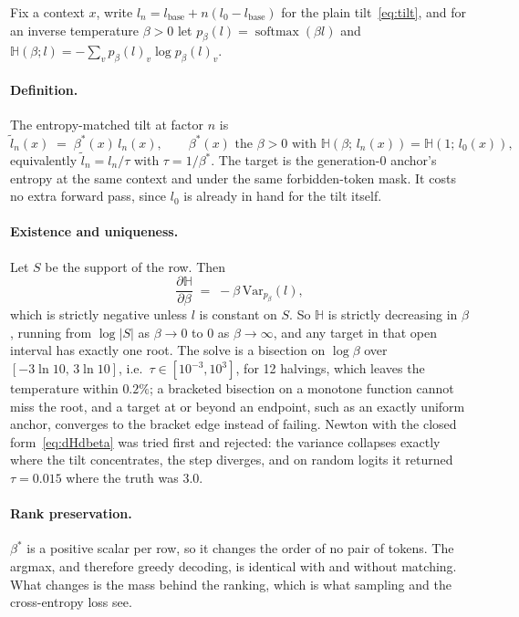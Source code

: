 \documentclass[11pt,a4paper]{article}
\newcommand{\softmax}{\operatorname{softmax}}
\begin{document}
Fix a context $x$, write $l_n = l_{\mathrm{base}} + n(l_0 - l_{\mathrm{base}})$ for the plain
tilt~\eqref{eq:tilt}, and for an inverse temperature $\beta > 0$ let
$p_\beta(l) = \softmax(\beta l)$ and $\mathbb{H}(\beta; l) = -\sum_v p_\beta(l)_v \log p_\beta(l)_v$.

\paragraph{Definition.} The entropy-matched tilt at factor $n$ is
\begin{equation}
  \tilde{l}_n(x) \;=\; \beta^{*}(x)\, l_n(x),
  \qquad
  \beta^{*}(x) \text{ the } \beta > 0 \text{ with } \mathbb{H}\!\left(\beta;\, l_n(x)\right) = \mathbb{H}\!\left(1;\, l_0(x)\right),
  \label{eq:entropymatch}
\end{equation}
equivalently $\tilde{l}_n = l_n / \tau$ with $\tau = 1/\beta^{*}$. The target is the
generation-0 anchor's entropy at the same context and under the same forbidden-token mask. It costs
no extra forward pass, since $l_0$ is already in hand for the tilt itself.

\paragraph{Existence and uniqueness.} Let $S$ be the support of the row. Then
\begin{equation}
  \frac{\partial \mathbb{H}}{\partial \beta} \;=\; -\beta \,\mathrm{Var}_{p_\beta}(l),
  \label{eq:dHdbeta}
\end{equation}
which is strictly negative unless $l$ is constant on $S$. So $\mathbb{H}$ is strictly decreasing in
$\beta$, running from $\log|S|$ as $\beta \to 0$ to $0$ as $\beta \to \infty$, and any target in
that open interval has exactly one root. The solve is a bisection on $\log\beta$ over
$[-3\ln 10,\, 3\ln 10]$, i.e.\ $\tau \in [10^{-3}, 10^{3}]$, for 12 halvings, which leaves the temperature within $0.2\%$; a bracketed bisection
on a monotone function cannot miss the root, and a target at or beyond an endpoint, such as an
exactly uniform anchor, converges to the bracket edge instead of failing. Newton with the closed
form~\eqref{eq:dHdbeta} was tried first and rejected: the variance collapses exactly where the tilt
concentrates, the step diverges, and on random logits it returned $\tau = 0.015$ where the truth
was $3.0$.

\paragraph{Rank preservation.} $\beta^{*}$ is a positive scalar per row, so it changes the order of
no pair of tokens. The argmax, and therefore greedy decoding, is identical with and without
matching. What changes is the mass behind the ranking, which is what sampling and the
cross-entropy loss see.
\end{document}
